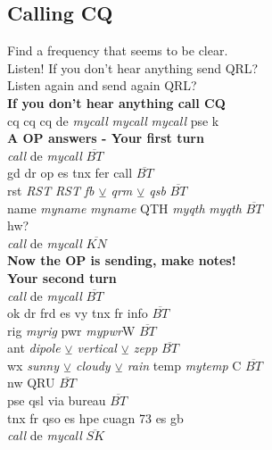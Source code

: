 \documentclass[10pt]{article}
\begin{document}
\begin{multicols}{3}
\subsection{Calling CQ}
\vspace{\baselineskip}
Find a frequency that seems to be clear.\\
Listen! If you don't hear anything send QRL?\\ 
Listen again and send again QRL?\\
\textbf{If you don't hear anything call CQ}\\
cq cq cq de \textit{mycall} \textit{mycall} \textit{mycall} pse k\\ 
\textbf{A OP answers - Your first turn}\\
\textit{call} de \textit{mycall} $\overline{BT}$\\ gd dr op es tnx fer call $\overline{BT}$\\ rst \textit{RST} \textit{RST} \textit{fb $\veebar$ qrm $\veebar$ qsb} $\overline{BT}$\\ name \textit{myname} \textit{myname} QTH \textit{myqth} \textit{myqth} $\overline{BT}$\\ hw?\\ \textit{call} de \textit{mycall} $\overline{KN}$\\
\textbf{Now the OP is sending, make notes!}\\
\textbf{Your second turn}\\
\textit{call} de \textit{mycall} $\overline{BT}$\\ 
ok dr frd es vy tnx fr info $\overline{BT}$\\ 
rig \textit{myrig} pwr \textit{mypwr}W $\overline{BT}$\\
ant \textit{dipole $\veebar$ vertical $\veebar$ zepp} $\overline{BT}$\\
wx \textit{sunny $\veebar$ cloudy $\veebar$ rain} temp \textit{mytemp} C $\overline{BT}$\\
nw QRU $\overline{BT}$\\
pse qsl via bureau $\overline{BT}$\\
tnx fr qso es hpe cuagn 73 es gb\\
\textit{call} de \textit{mycall} $\overline{SK}$\\
\vspace{\baselineskip}

\end{multicols}
\end{document}
